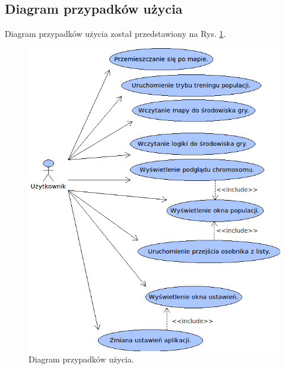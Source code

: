 \subsection{Diagram przypadków użycia}
\begin{par}
	Diagram przypadków użycia został przedstawiony na Rys. \ref{fig:diagram_przypadkow}.
		\begin{figure}[!h]
		\centering
		\includegraphics[width=\textwidth]{obrazki/diagram_przypadkow.png}
		\caption{Diagram przypadków użycia.}
		\label{fig:diagram_przypadkow}
		\end{figure}
		\FloatBarrier
\end{par}

